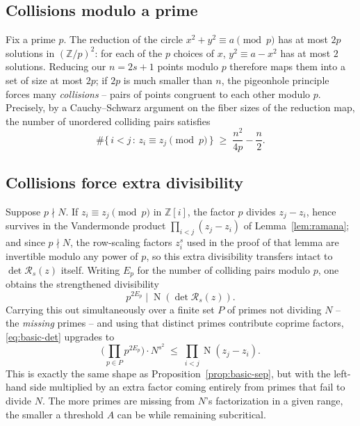 \documentclass[11pt]{amsart}
\theoremstyle{definition}
\theoremstyle{remark}
\newcommand{\Z}{\mathbb{Z}}
\DeclareMathOperator{\Nm}{N}
\newcommand{\nm}[1]{\Nm(#1)}
\begin{document}
\subsection{Collisions modulo a prime}

Fix a prime $p$. The reduction of the circle $x^2+y^2\equiv a \pmod p$ has at most $2p$ solutions in $(\Z/p)^2$: for each of the $p$ choices of $x$, $y^2\equiv a-x^2$ has at most $2$ solutions. Reducing our $n=2s+1$ points modulo $p$ therefore maps them into a set of size at most $2p$; if $2p$ is much smaller than $n$, the pigeonhole principle forces many \emph{collisions} -- pairs of points congruent to each other modulo $p$. Precisely, by a Cauchy--Schwarz argument on the fiber sizes of the reduction map, the number of unordered colliding pairs satisfies
\begin{equation}\label{eq:collision}
\#\{\,i<j \,:\, z_i \equiv z_j \!\!\pmod p\,\} \;\ge\; \frac{n^2}{4p} - \frac{n}{2}.
\end{equation}

\subsection{Collisions force extra divisibility}

Suppose $p \nmid N$. If $z_i \equiv z_j \pmod p$ in $\Z[i]$, the factor $p$ divides $z_j-z_i$, hence survives in the Vandermonde product $\prod_{i<j}(z_j-z_i)$ of Lemma~\ref{lem:ramana}; and since $p\nmid N$, the row-scaling factors $z_i^s$ used in the proof of that lemma are invertible modulo any power of $p$, so this extra divisibility transfers intact to $\det \mathcal R_s(z)$ itself. Writing $E_p$ for the number of colliding pairs modulo $p$, one obtains the strengthened divisibility
\[
p^{2E_p} \;\Big|\; \nm{\det \mathcal R_s(z)}.
\]
Carrying this out simultaneously over a finite set $P$ of primes not dividing $N$ -- the \emph{missing} primes -- and using that distinct primes contribute coprime factors, \eqref{eq:basic-det} upgrades to
\begin{equation}\label{eq:missing-det}
\Big(\prod_{p \in P} p^{2E_p}\Big) \cdot N^{s^2} \;\le\; \prod_{i<j} \nm{z_j-z_i}.
\end{equation}
This is exactly the same shape as Proposition~\ref{prop:basic-sep}, but with the left-hand side multiplied by an extra factor coming entirely from primes that fail to divide $N$. The more primes are missing from $N$'s factorization in a given range, the smaller a threshold $A$ can be while remaining subcritical.
\end{document}
